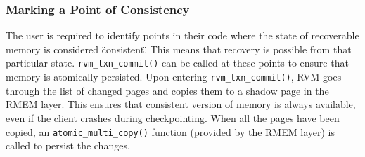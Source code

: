 \subsubsection{Marking a Point of Consistency}
The user is required to identify points in their code where the state of
recoverable memory is considered \"consistent\". This means that recovery is
possible from that particular state. \verb|rvm_txn_commit()| can be called at
these points to ensure that memory is atomically persisted. Upon entering
\verb|rvm_txn_commit()|, RVM goes through the list of changed pages and copies
them to a shadow page in the RMEM layer. This ensures that consistent version
of memory is always available, even if the client crashes during checkpointing.
When all the pages have been copied, an \verb|atomic_multi_copy()| function
(provided by the RMEM layer) is called to persist the changes.

